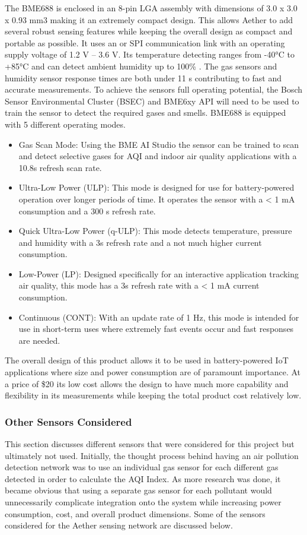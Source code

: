 The BME688 is enclosed in an 8-pin LGA assembly with dimensions of 3.0 x 3.0 x 0.93 mm3 making it an extremely compact design. This allows Aether to add several robust sensing features while keeping the overall design as compact and portable as possible. It uses an \iic or SPI communication link with an operating supply voltage of 1.2 V – 3.6 V. Its temperature detecting ranges from -40°C to +85°C and can detect ambient humidity up to 100\% . The gas sensors and humidity sensor response times are both under 11 s contributing to fast and accurate measurements. To achieve the sensors full operating potential, the Bosch Sensor Environmental Cluster (BSEC) and BME6xy API will need to be used to train the sensor to detect the required gases and smells. BME688 is equipped with 5 different operating modes.

\begin {itemize}
\item Gas Scan Mode: Using the BME AI Studio the sensor can be trained to scan and detect selective gases for AQI and indoor air quality applications with a 10.8s refresh scan rate.
\item Ultra-Low Power (ULP): This mode is designed for use for battery-powered operation over longer periods of time. It operates the sensor with a < 1 mA consumption and a 300 s refresh rate.
\item Quick Ultra-Low Power (q-ULP): This mode detects temperature, pressure and humidity with a 3s refresh rate and a not much higher current consumption.
\item Low-Power (LP): Designed specifically for an interactive application tracking air quality, this mode has a 3s refresh rate with a < 1 mA current consumption. 
\item Continuous (CONT): With an update rate of 1 Hz, this mode is intended for use in short-term uses where extremely fast events occur and fast responses are needed. 

\end {itemize}
The overall design of this product allows it to be used in battery-powered IoT applications where size and power consumption are of paramount importance. At a price of \$20 its low cost allows the design to have much more capability and flexibility in its measurements while keeping the total product cost relatively low.

\subsubsection{Other Sensors Considered}
This section discusses different sensors that were considered for this project but ultimately not used. Initially, the thought process behind having an air pollution detection network was to use an individual gas sensor for each different gas detected in order to calculate the AQI Index. As more research was done, it became obvious that using a separate gas sensor for each pollutant would unnecessarily complicate integration onto the system while increasing power consumption, cost, and overall product dimensions. Some of the sensors considered for the Aether sensing network are discussed below.

